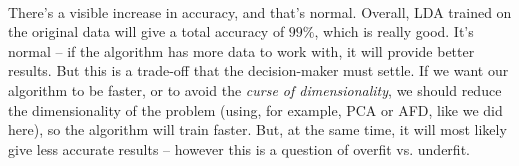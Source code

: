 \paragraph{}
There's a visible increase in accuracy, and that's normal.
Overall, LDA trained on the original data will give a total accuracy of $99\%$, which is really good.
It's normal – if the algorithm has more data to work with, it will provide better results.
But this is a trade-off that the decision-maker must settle.
If we want our algorithm to be faster, or to avoid the \emph{curse of dimensionality}, we should reduce the dimensionality of the problem (using, for example, PCA or AFD, like we did here), so the algorithm will train faster.
But, at the same time, it will most likely give less accurate results – however this is a question of overfit vs. underfit.
